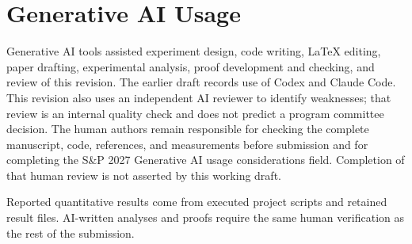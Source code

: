 \section{Generative AI Usage}
\label{sec:genai-usage}

Generative AI tools assisted experiment design, code writing, LaTeX editing, paper drafting,
experimental analysis, proof development and checking, and review of this
revision. The earlier draft records use
of Codex and Claude Code. This revision also uses an independent AI reviewer to
identify weaknesses; that review is an internal quality check and does not
predict a program committee decision. The human authors remain responsible
for checking the complete manuscript, code, references, and measurements before
submission and for completing the S\&P 2027 Generative AI usage considerations
field. Completion of that human review is not asserted by this working draft.

Reported quantitative results come from executed project scripts and retained
result files. AI-written analyses and proofs require the same human verification
as the rest of the submission.
